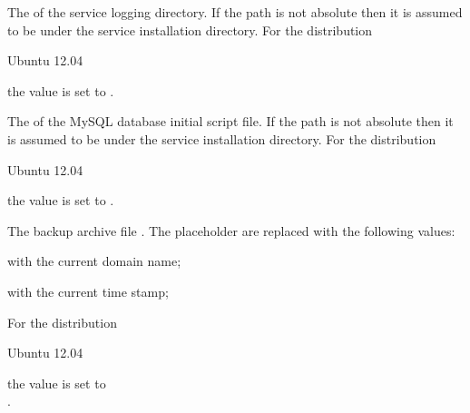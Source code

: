 
The  of the service logging directory. If the path is
not absolute then it is assumed to be under the service installation
directory.
For the distribution
\begin{inparaitem}
\item[\TheDistribution{ubuntu}] Ubuntu 12.04
\end{inparaitem}
the value is set to .


The  of the MySQL database initial script file. If the path is
not absolute then it is assumed to be under the service installation
directory.
For the distribution
\begin{inparaitem}
\item[\TheDistribution{ubuntu}] Ubuntu 12.04
\end{inparaitem}
the value is set to .


The backup archive file .
The placeholder are replaced with the following values:

\begin{compactitem}
\item {} with the current domain name;
\item {} with the current time stamp;
\end{compactitem}

For the distribution
\begin{inparaitem}
\item[\TheDistribution{ubuntu}] Ubuntu 12.04
\end{inparaitem}
the value is set to\\ .

